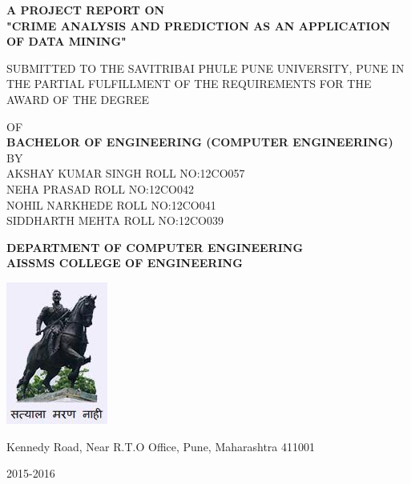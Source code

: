 \begin{titlepage}
\centering


%

\textbf{A PROJECT REPORT ON}\\\vspace{1cm}\large\textbf{"CRIME ANALYSIS AND PREDICTION AS AN APPLICATION OF DATA MINING"}\\\vspace{1cm}

SUBMITTED TO THE SAVITRIBAI PHULE PUNE UNIVERSITY, PUNE
IN THE PARTIAL FULFILLMENT OF THE REQUIREMENTS 
FOR THE AWARD OF THE DEGREE 
\begin{center}

\vspace{1cm} OF\\\vspace{1cm}\textbf{BACHELOR OF ENGINEERING (COMPUTER ENGINEERING) }\\\vspace{1cm}BY\vspace{1cm}\\
{\small{AKSHAY KUMAR SINGH} \hspace{22mm} {\small ROLL NO:12CO057}\\{NEHA PRASAD} \hspace{36.5mm} {\small ROLL NO:12CO042 } \\{NOHIL NARKHEDE} \hspace{29mm} {\small ROLL NO:12CO041 } \\{SIDDHARTH MEHTA} \hspace{26.8mm} {\small ROLL NO:12CO039 }\\\vspace{1cm}}
\end{center}
\textbf{DEPARTMENT OF COMPUTER ENGINEERING}\\ 
\textbf{AISSMS COLLEGE OF ENGINEERING} \\
\begin{center}
\includegraphics[scale=0.6]{logo.png}
\end{center}
Kennedy Road, Near R.T.O Office, Pune, Maharashtra 411001

2015-2016
\end{titlepage}
